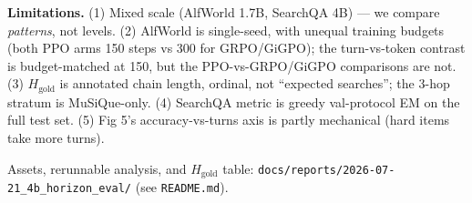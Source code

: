 \documentclass[11pt]{article}
\begin{document}
\textbf{Limitations.} (1) Mixed scale (AlfWorld 1.7B, SearchQA 4B) --- we compare \emph{patterns},
not levels. (2) AlfWorld is single-seed, with unequal training budgets (both PPO arms 150 steps vs 300 for
GRPO/GiGPO); the turn-vs-token contrast is budget-matched at 150, but the PPO-vs-GRPO/GiGPO
comparisons are not. (3) $H_{\text{gold}}$ is annotated chain length, ordinal, not ``expected
searches''; the 3-hop stratum is MuSiQue-only. (4) SearchQA metric is greedy val-protocol EM on the
full test set. (5) Fig 5's accuracy-vs-turns axis is partly mechanical (hard items take more turns).

\vspace{4pt}\noindent\footnotesize Assets, rerunnable analysis, and $H_{\text{gold}}$ table:
\texttt{docs/reports/2026-07-21\_4b\_horizon\_eval/} (see \texttt{README.md}).
\end{document}
